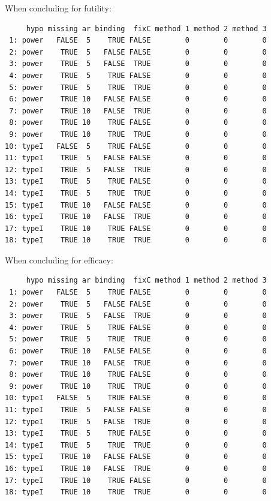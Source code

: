 \documentclass[12pt]{article}
\begin{document}
When concluding for futility:
\begin{verbatim}
     hypo missing ar binding  fixC method 1 method 2 method 3
 1: power   FALSE  5    TRUE FALSE        0        0        0
 2: power    TRUE  5   FALSE FALSE        0        0        0
 3: power    TRUE  5   FALSE  TRUE        0        0        0
 4: power    TRUE  5    TRUE FALSE        0        0        0
 5: power    TRUE  5    TRUE  TRUE        0        0        0
 6: power    TRUE 10   FALSE FALSE        0        0        0
 7: power    TRUE 10   FALSE  TRUE        0        0        0
 8: power    TRUE 10    TRUE FALSE        0        0        0
 9: power    TRUE 10    TRUE  TRUE        0        0        0
10: typeI   FALSE  5    TRUE FALSE        0        0        0
11: typeI    TRUE  5   FALSE FALSE        0        0        0
12: typeI    TRUE  5   FALSE  TRUE        0        0        0
13: typeI    TRUE  5    TRUE FALSE        0        0        0
14: typeI    TRUE  5    TRUE  TRUE        0        0        0
15: typeI    TRUE 10   FALSE FALSE        0        0        0
16: typeI    TRUE 10   FALSE  TRUE        0        0        0
17: typeI    TRUE 10    TRUE FALSE        0        0        0
18: typeI    TRUE 10    TRUE  TRUE        0        0        0
\end{verbatim}

When concluding for efficacy:
\begin{verbatim}
     hypo missing ar binding  fixC method 1 method 2 method 3
 1: power   FALSE  5    TRUE FALSE        0        0        0
 2: power    TRUE  5   FALSE FALSE        0        0        0
 3: power    TRUE  5   FALSE  TRUE        0        0        0
 4: power    TRUE  5    TRUE FALSE        0        0        0
 5: power    TRUE  5    TRUE  TRUE        0        0        0
 6: power    TRUE 10   FALSE FALSE        0        0        0
 7: power    TRUE 10   FALSE  TRUE        0        0        0
 8: power    TRUE 10    TRUE FALSE        0        0        0
 9: power    TRUE 10    TRUE  TRUE        0        0        0
10: typeI   FALSE  5    TRUE FALSE        0        0        0
11: typeI    TRUE  5   FALSE FALSE        0        0        0
12: typeI    TRUE  5   FALSE  TRUE        0        0        0
13: typeI    TRUE  5    TRUE FALSE        0        0        0
14: typeI    TRUE  5    TRUE  TRUE        0        0        0
15: typeI    TRUE 10   FALSE FALSE        0        0        0
16: typeI    TRUE 10   FALSE  TRUE        0        0        0
17: typeI    TRUE 10    TRUE FALSE        0        0        0
18: typeI    TRUE 10    TRUE  TRUE        0        0        0
\end{verbatim}
\end{document}
